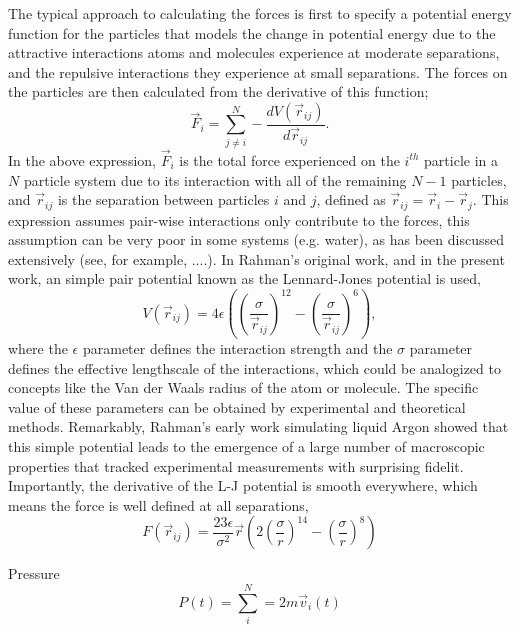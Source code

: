 \documentclass[journal=jpclcd,manuscript=article]{achemso}
\begin{document}
The typical approach to calculating the forces is first to specify a potential energy function for the particles
that models the change in potential energy due to the attractive interactions atoms and molecules experience
at moderate separations, and the repulsive interactions they experience at small separations.  The forces on the particles
are then calculated from the derivative of this function;
\begin{equation}
\vec{F}_i = \sum_{j \neq i}^N - \frac{d V( \vec{r}_{ij}) }{d \vec{r}_{ij}}.
\end{equation}
In the above expression, $\vec{F}_i$ is the total force experienced on the $i^{th}$ particle in a $N$ particle system
due to its interaction with all of the remaining $N-1$ particles, and $\vec{r}_{ij}$ is the separation between
particles $i$ and $j$, defined as $\vec{r}_{ij} = \vec{r}_i - \vec{r}_j$.  This expression assumes pair-wise interactions only contribute to the forces, this assumption
can be very poor in some systems (e.g. water), as has been discussed extensively (see, for example, ....).  
In Rahman's original work, and in the present work, an simple pair potential known as the Lennard-Jones potential 
is used,
\begin{equation}
V( \vec{r}_{ij}) = 4 \epsilon \left( \left( \frac{\sigma}{\vec{r}_{ij}} \right)^{12} - \left(\frac{\sigma}{\vec{r}_{ij}} \right)^6 \right),
\end{equation}
where the $\epsilon$ parameter defines the interaction strength and the $\sigma$ parameter defines the effective
lengthscale of the interactions, which could be analogized to concepts like the Van der Waals radius of the atom or molecule.
The specific value of these parameters can be obtained by experimental and theoretical methods.  Remarkably, Rahman's early
work simulating liquid Argon showed that this simple potential leads to the emergence of a large number of macroscopic properties 
that tracked experimental measurements with surprising fidelit. %
Importantly, the derivative of the L-J potential is smooth everywhere, which means the force is well defined
at all separations, 
\begin{equation}
F(\vec{r}_{ij}) = \frac{23 \epsilon}{\sigma^2} \vec{r} \left( 2\left(\frac{\sigma}{r}\right)^{14} - \left(\frac{\sigma}{r}\right)^8\right)
\end{equation}

Pressure
\begin{equation}
P(t) = \sum_i^N = 2 m \vec{v}_i(t)
\end{equation}
\end{document}
